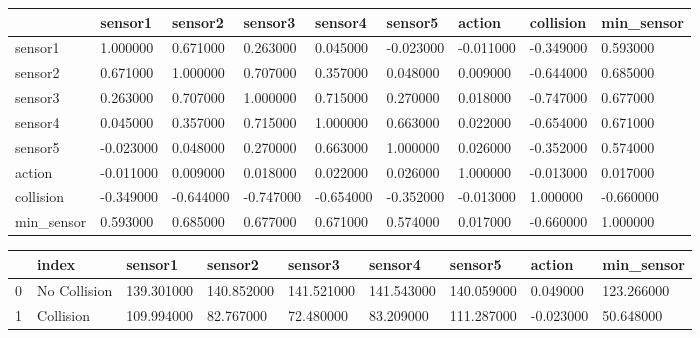 \bigskip\noindent
\begin{tabular}{p{}p{}p{}p{}p{}p{}p{}p{}p{}}
\toprule
~ & sensor1 & sensor2 & sensor3 & sensor4 & sensor5 & action & collision & min\_sensor \\
\hline
sensor1 & 1.000000 & 0.671000 & 0.263000 & 0.045000 & -0.023000 & -0.011000 & -0.349000 & 0.593000 \\
\hline
sensor2 & 0.671000 & 1.000000 & 0.707000 & 0.357000 & 0.048000 & 0.009000 & -0.644000 & 0.685000 \\
\hline
sensor3 & 0.263000 & 0.707000 & 1.000000 & 0.715000 & 0.270000 & 0.018000 & -0.747000 & 0.677000 \\
\hline
sensor4 & 0.045000 & 0.357000 & 0.715000 & 1.000000 & 0.663000 & 0.022000 & -0.654000 & 0.671000 \\
\hline
sensor5 & -0.023000 & 0.048000 & 0.270000 & 0.663000 & 1.000000 & 0.026000 & -0.352000 & 0.574000 \\
\hline
action & -0.011000 & 0.009000 & 0.018000 & 0.022000 & 0.026000 & 1.000000 & -0.013000 & 0.017000 \\
\hline
collision & -0.349000 & -0.644000 & -0.747000 & -0.654000 & -0.352000 & -0.013000 & 1.000000 & -0.660000 \\
\hline
min\_sensor & 0.593000 & 0.685000 & 0.677000 & 0.671000 & 0.574000 & 0.017000 & -0.660000 & 1.000000 \\
\hline
\bottomrule
\end{tabular}

\bigskip

\bigskip\noindent
\begin{tabular}{p{}p{}p{}p{}p{}p{}p{}p{}p{}}
\toprule
~ & index & sensor1 & sensor2 & sensor3 & sensor4 & sensor5 & action & min\_sensor \\
\hline
0 & No Collision & 139.301000 & 140.852000 & 141.521000 & 141.543000 & 140.059000 & 0.049000 & 123.266000 \\
\hline
1 & Collision & 109.994000 & 82.767000 & 72.480000 & 83.209000 & 111.287000 & -0.023000 & 50.648000 \\
\hline
\bottomrule
\end{tabular}

